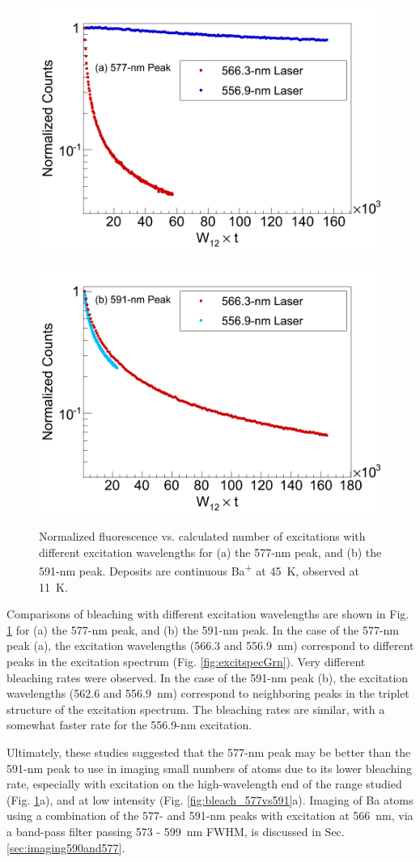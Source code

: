 \begin{figure} %
        \centering
                \includegraphics[width=.5\textwidth]{figures/bleach_compareExcitations_specificSigmas_a.png}
                ~
                \includegraphics[width=.5\textwidth]{figures/bleach_compareExcitations_specificSigmas_b.png}
                \caption{Normalized fluorescence vs. calculated number of excitations with different excitation wavelengths for (a) the 577-nm peak, and (b) the 591-nm peak.  Deposits are continuous Ba\textsuperscript{+} at 45~K, observed at 11~K.}
\label{fig:bleach_excitCompare}
\end{figure}

Comparisons of bleaching with different excitation wavelengths are shown in Fig. \ref{fig:bleach_excitCompare} for (a) the 577-nm peak, and (b) the 591-nm peak.  In the case of the 577-nm peak (a), the excitation wavelengths (566.3 and 556.9~nm) correspond to different peaks in the excitation spectrum (Fig. \ref{fig:excitspecGrn}).  Very different bleaching rates were observed.  In the case of the 591-nm peak (b), the excitation wavelengths (562.6 and 556.9~nm) correspond to neighboring peaks in the triplet structure of the excitation spectrum.  The bleaching rates are similar, with a somewhat faster rate for the 556.9-nm excitation.


Ultimately, these studies suggested that the 577-nm peak may be better than the 591-nm peak to use in imaging small numbers of atoms due to its lower bleaching rate, especially with excitation on the high-wavelength end of the range studied (Fig. \ref{fig:bleach_excitCompare}a), and at low intensity (Fig. \ref{fig:bleach_577vs591}a).  Imaging of Ba atoms using a combination of the 577- and 591-nm peaks with excitation at 566~nm, via a band-pass filter passing 573 - 599~nm FWHM, is discussed in Sec. \ref{sec:imaging590and577}.

